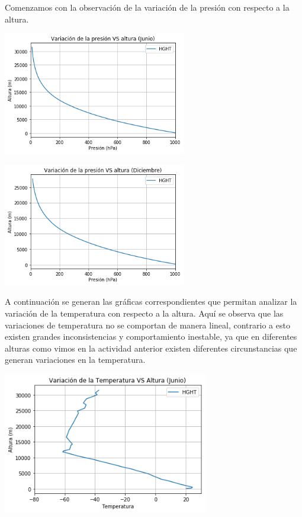 \documentclass{article} %
\begin{document}
Comenzamos con la observación de la variación de la presión con respecto a la altura. 

 \begin{center}
 	\includegraphics[width=8cm]{1.png}
 \end{center}


 \begin{center}
 	\includegraphics[width=8cm]{2.png}
 \end{center}

A continuación se generan las gráficas correspondientes que permitan analizar la variación de la temperatura con respecto a la altura. Aquí se observa que las variaciones de temperatura no se comportan de manera lineal, contrario a esto existen grandes inconsistencias y comportamiento inestable, ya que en diferentes alturas como vimos en la actividad anterior existen diferentes circunstancias que generan variaciones en la temperatura. 

 \begin{center}
 	\includegraphics[width=9cm]{3.png}
 \end{center}
\end{document}
